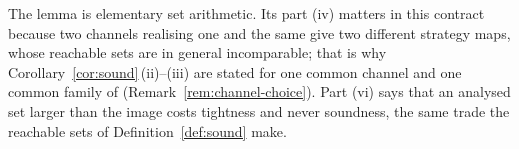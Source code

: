 
The lemma is elementary set arithmetic. Its part (iv) matters in this
contract because two channels realising one and the same
give two different strategy maps, whose reachable sets are in general
incomparable; that is why Corollary~\ref{cor:sound}\,(ii)--(iii) are stated for
one common channel and one common family of 
(Remark~\ref{rem:channel-choice}). Part (vi) says that an analysed set larger
than the image costs tightness and never soundness, the same trade the
reachable sets of Definition~\ref{def:sound} make.

